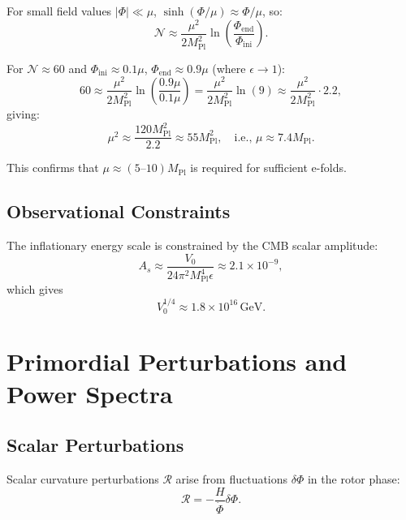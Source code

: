 \documentclass[11pt,a4paper]{article}
\numberwithin{equation}{section}
\theoremstyle{plain}
\theoremstyle{definition}
\theoremstyle{remark}
\begin{document}
For small field values $|\Phi| \ll \mu$, $\sinh(\Phi/\mu) \approx \Phi/\mu$, so:
\begin{equation}
\mathcal{N} \approx \frac{\mu^2}{2M_{\mathrm{Pl}}^2}\ln\left(\frac{\Phi_{\mathrm{end}}}{\Phi_{\mathrm{ini}}}\right).
\label{eq:efolds-tanh-approx}
\end{equation}

For $\mathcal{N} \approx 60$ and $\Phi_{\mathrm{ini}} \approx 0.1\mu$, $\Phi_{\mathrm{end}} \approx 0.9\mu$ (where $\epsilon \to 1$):
\begin{equation}
60 \approx \frac{\mu^2}{2M_{\mathrm{Pl}}^2}\ln\left(\frac{0.9\mu}{0.1\mu}\right) = \frac{\mu^2}{2M_{\mathrm{Pl}}^2}\ln(9) \approx \frac{\mu^2}{2M_{\mathrm{Pl}}^2}\cdot 2.2,
\end{equation}
giving:
\begin{equation}
\mu^2 \approx \frac{120M_{\mathrm{Pl}}^2}{2.2} \approx 55M_{\mathrm{Pl}}^2,\quad\text{i.e., }\mu \approx 7.4M_{\mathrm{Pl}}.
\end{equation}

This confirms that $\mu \approx (5\text{--}10)M_{\mathrm{Pl}}$ is required for sufficient e-folds.

\subsection{Observational Constraints}

The inflationary energy scale is constrained by the CMB scalar amplitude:
\begin{equation}
A_s \approx \frac{V_0}{24\pi^2 M_{\mathrm{Pl}}^4\epsilon} \approx 2.1 \times 10^{-9},
\end{equation}
which gives
\begin{equation}
V_0^{1/4} \approx 1.8 \times 10^{16}\,\mathrm{GeV}.
\label{eq:V0-scale}
\end{equation}

\section{Primordial Perturbations and Power Spectra}
\label{sec:pert}

\subsection{Scalar Perturbations}

Scalar curvature perturbations $\mathcal{R}$ arise from fluctuations $\delta\Phi$ in the rotor phase:
\begin{equation}
\mathcal{R} = -\frac{H}{\dot{\Phi}}\delta\Phi.
\end{equation}
\end{document}
